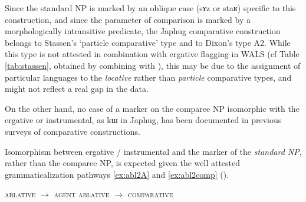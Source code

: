 \documentclass[oldfontcommands,oneside,a4paper,11pt]{article}
\newcommand{\ipa}[1]{{\phon #1}} %
\begin{document}
Since the standard NP is marked by an oblique case (\ipa{sɤz} or \ipa{staʁ}) specific to this construction, and since the parameter of comparison is marked by a morphologically intransitive predicate, the Japhug comparative construction belongs to Stassen's  \citeyearpar{stassen11comparative} `particle comparative' type and to Dixon's \citeyearpar[789]{dixon08comparative} type A2.  While this type is not attested in combination with  ergative flagging in WALS (cf Table \ref{tab:stassen}, obtained by combining \citealt{stassen11comparative} with \citealt{comrie11case}), this may be due to the assignment of particular languages to the \textit{locative} rather than \textit{particle}  comparative types, and might not reflect a real gap in the data.

On the other hand, no case of a marker   on the comparee NP isomorphic with the ergative or instrumental, as \ipa{kɯ} in Japhug, has been documented in   previous surveys of comparative constructions.

\begin{table}[h]
\caption{Combination of chapters 98 (Alignment of Case Marking of Full Nouns) and 121 (Comparative constructions) of the WALS} \label{tab:stassen}
\end{table}
 
Isomorphism between ergative / instrumental and the marker of the \textit{standard NP}, rather than the comparee NP, is expected given the well attested grammaticalization pathways \ref{ex:abl2A} and \ref{ex:abl2comp} (\citealt[29]{heine-kuteva02}).
 


\begin{exe}
\ex \label{ex:abl2A}
\glt \textsc{ablative} $\rightarrow$ \textsc{agent} 
\ex \label{ex:abl2comp}
\glt \textsc{ablative} $\rightarrow$ \textsc{comparative}
\end{exe}
\end{document}
